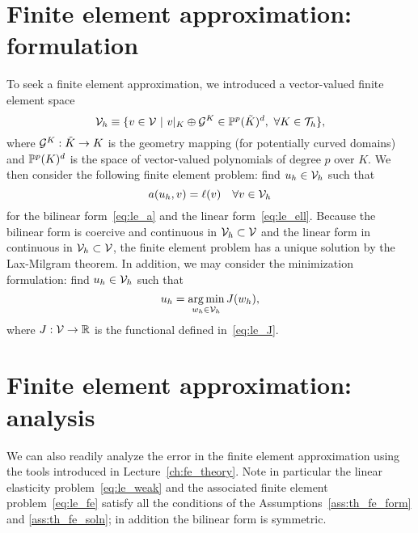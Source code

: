 \section{Finite element approximation: formulation}
To seek a finite element approximation, we introduced a vector-valued finite element space
\begin{equation*}
  \mathcal{V}_h \equiv \{ v \in \mathcal{V} \ | \ v|_K \oplus \mathcal{G}^K \in \mathbb{P}^p(\tilde K)^d, \ \forall K \in \mathcal{T}_h \},
\end{equation*}
where $\mathcal{G}^K: \tilde K \to K$ is the geometry mapping (for potentially curved domains) and $\mathbb{P}^p(K)^d$ is the space of vector-valued polynomials of degree $p$ over $K$. We then consider the following finite element problem: find $u_h \in \mathcal{V}_h$ such that
\begin{equation}
  a(u_h,v) = \ell(v) \quad \forall v \in \mathcal{V}_h
  \label{eq:le_fe}
\end{equation}
for the bilinear form~\eqref{eq:le_a} and the linear form~\eqref{eq:le_ell}. Because the bilinear form is coercive and continuous in $\mathcal{V}_h \subset \mathcal{V}$ and the linear form in continuous in $\mathcal{V}_h \subset \mathcal{V}$, the finite element problem has a unique solution by the Lax-Milgram theorem. In addition, we may consider the minimization formulation: find $u_h \in \mathcal{V}_h$ such that
\begin{equation*}
  u_h = \operatorname*{arg\,min}_{w_h \in \mathcal{V}_h} J(w_h),
\end{equation*}
where $J: \mathcal{V} \to \mathbb{R}$ is the functional defined in~\eqref{eq:le_J}.


\section{Finite element approximation: analysis}
\label{sec:le_fe_analysis}
We can also readily analyze the error in the finite element approximation using the tools introduced in Lecture~\ref{ch:fe_theory}. Note in particular the linear elasticity problem~\eqref{eq:le_weak} and the associated finite element problem~\eqref{eq:le_fe} satisfy all the conditions of the Assumptions~\ref{ass:th_fe_form} and \ref{ass:th_fe_soln}; in addition the bilinear form is symmetric.

